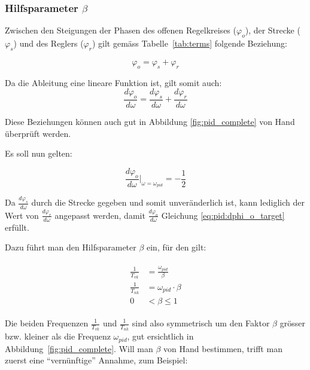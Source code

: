 \subsubsection{Hilfsparameter $\beta$}

Zwischen  den Steigungen  der Phasen  des offenen  Regelkreises ($\varphi_o$),
der  Strecke  ($\varphi_s$)  und   des  Reglers  ($\varphi_r$)  gilt  gem\"ass
Tabelle~\ref{tab:terms} folgende Beziehung:

\begin{equation} \label{eq:pid:phi_sum}
    \varphi_o = \varphi_s + \varphi_r
\end{equation}

Da die Ableitung eine lineare Funktion ist, gilt somit auch:
\begin{equation} \label{eq:pid:dphi_sum}
    \frac{d\varphi_o}{d\omega} = \frac{d\varphi_s}{d\omega} + \frac{d\varphi_r}{d\omega}
\end{equation}

Diese Beziehungen  k\"onnen auch  gut in Abbildung  \ref{fig:pid_complete} von
Hand \"uberpr\"uft werden.

Es soll nun gelten:

\begin{equation} \label{eq:pid:dphi_o_target}
    \frac{d\varphi_o}{d\omega} \biggr \rvert_{\omega=\omega_{pid}} = - \frac{1}{2}
\end{equation}

Da   $\frac{d\varphi_s}{d\omega}$  durch   die  Strecke   gegeben  und   somit
unver\"anderlich ist, kann lediglich der Wert von $\frac{d\varphi_r}{d\omega}$
angepasst     werden,     damit     $\frac{d\varphi_o}{d\omega}$     Gleichung
\ref{eq:pid:dphi_o_target} erf\"ullt.

Dazu f\"uhrt man den Hilfsparameter $\beta$ ein, f\"ur den gilt:

\begin{gather} \label{eq:pid:beta:start}
    \begin{split}
        \frac{1}{T_{vk}} & = \frac{\omega_{pid}}{\beta} \\
        \frac{1}{T_{nk}} & = \omega_{pid} \cdot \beta  \\
                       0 & <  \beta \leq 1
    \end{split}
\end{gather}

Die  beiden Frequenzen  $\frac{1}{T_{vk}}$  und  $\frac{1}{T_{nk}}$ sind  also
symmetrisch  um den  Faktor $\beta$  gr\"osser bzw.  kleiner als  die Frequenz
$\omega_{pid}$, gut ersichtlich  in Abbildung~\ref{fig:pid_complete}. Will man
$\beta$ von Hand bestimmen, trifft  man zuerst eine ``vern\"unftige'' Annahme,
zum Beispiel:

